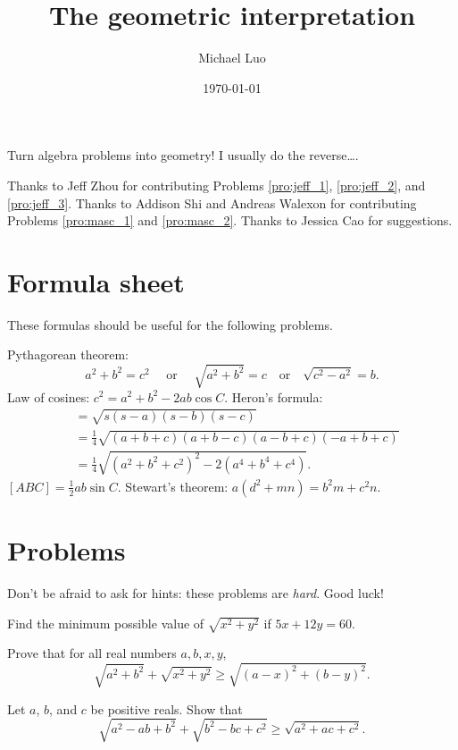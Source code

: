 \documentclass[11pt]{scrartcl}
\author{Michael Luo}
\title{The geometric interpretation}
\date{\today}
\begin{document}
Turn algebra problems into geometry! I usually do the reverse\dots.

Thanks to Jeff Zhou for contributing Problems \ref{pro:jeff_1}, \ref{pro:jeff_2}, and \ref{pro:jeff_3}. Thanks to Addison Shi and Andreas Walexon for contributing Problems \ref{pro:masc_1} and \ref{pro:masc_2}. Thanks to Jessica Cao for suggestions.

\section{Formula sheet}

These formulas should be useful for the following problems.

\begin{itemize}
    \ii Pythagorean theorem:
    \[a^2 + b^2 = c^2 \quad \text{ or } \quad \sqrt{a^2 + b^2} = c \quad \text{or} \quad \sqrt{c^2 - a^2} = b.\]
    \ii Law of cosines: $c^2 = a^2 + b^2 - 2ab\cos C$.
    \ii Heron's formula:
    \begin{align*}
        [ABC] &= \sqrt{s(s - a)(s - b)(s - c)} \\
        &= \frac14\sqrt{(a + b + c)(a + b - c)(a - b + c)(-a + b + c)} \\
        &= \frac14\sqrt{(a^2 + b^2 + c^2)^2 - 2(a^4 + b^4 + c^4)}.
    \end{align*}
    \ii $[ABC] = \frac12 ab\sin C$.
    \ii Stewart's theorem: $a(d^2 + mn) = b^2m + c^2n$.
\end{itemize}

\section{Problems}

Don't be afraid to ask for hints: these problems are \emph{hard}. Good luck!

\begin{problem}[AHSME 1961/40]\label{pro:jeff_1}
    Find the minimum possible value of $\sqrt{x^2 + y^2}$ if $5x + 12y = 60$.
\end{problem}

\begin{problem}\label{pro:jeff_2}
    Prove that for all real numbers $a,b,x,y$,
    \[\sqrt{a^2+b^2} + \sqrt{x^2+y^2} \ge \sqrt{(a-x)^2 + (b-y)^2}.\]
\end{problem}

\begin{problem}
    Let $a$, $b$, and $c$ be positive reals. Show that
    \[\sqrt{a^2 - ab + b^2} + \sqrt{b^2 - bc + c^2} \ge \sqrt{a^2 + ac + c^2}.\]
\end{problem}
\end{document}
